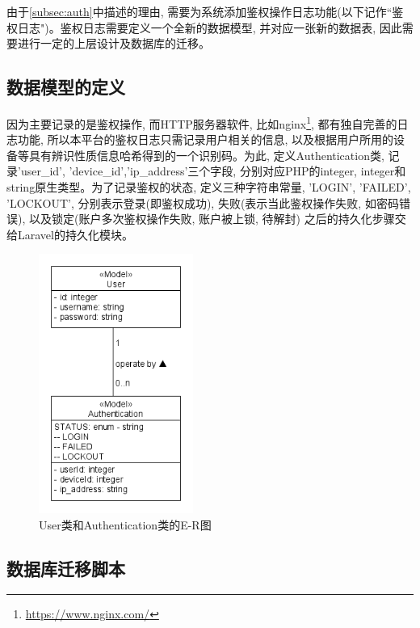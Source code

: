 由于\ref{subsec:auth}中描述的理由, 需要为系统添加鉴权操作日志功能(以下记作``鉴权日志")。鉴权日志需要定义一个全新的数据模型, 并对应一张新的数据表, 因此需要进行一定的上层设计及数据库的迁移。

\subsection{数据模型的定义}

因为主要记录的是鉴权操作, 而HTTP服务器软件, 比如nginx\footnote{\url{https://www.nginx.com/}}, 都有独自完善的日志功能, 所以本平台的鉴权日志只需记录用户相关的信息, 以及根据用户所用的设备等具有辨识性质信息哈希得到的一个识别码。为此, 定义Authentication类, 记录'user\_id', 'device\_id','ip\_address'三个字段, 分别对应PHP的integer, integer和string原生类型。为了记录鉴权的状态, 定义三种字符串常量, 'LOGIN', 'FAILED', 'LOCKOUT', 分别表示登录(即鉴权成功), 失败(表示当此鉴权操作失败, 如密码错误), 以及锁定(账户多次鉴权操作失败, 账户被上锁, 待解封) 之后的持久化步骤交给Laravel的持久化模块。

\begin{figure}[h]
    \centering
    \includegraphics[width=0.45\textwidth]{support-files/4.6.1-authentication-model-png.png}
    \caption{User类和Authentication类的E-R图}
    \label{fig:userauthmodeler}
\end{figure}



\subsection{数据库迁移脚本}

